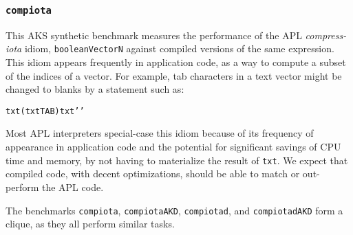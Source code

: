 \subsubsection{\tt compiota}
\label{benchmarkcompiota}

This AKS synthetic benchmark measures the performance of the
APL { \em compress-iota} idiom, {\tt booleanVector\qslash\qiota\0N}
against compiled versions of the same expression.
This idiom appears frequently in application code, as a
way to compute a subset of the indices of a vector.
For example, tab characters in a text vector might be
changed to blanks by a statement such as:

{\tt txt\qlbr (txt\qeps\0TAB)\qslash\qiota\qrho\0txt\qrbr\qlarrow'\qblank'}

Most APL interpreters special-case this idiom because of its
frequency of appearance in application code and the potential
for significant savings of CPU time and memory, by not having
to materialize the result of {\tt \qiota\qrho\0txt}. We expect
that compiled code, with decent optimizations, should be able
to match or out-perform the APL code.

The benchmarks {\tt compiota}, {\tt compiotaAKD}, {\tt compiotad}, and
{\tt compiotadAKD} form a clique, as they
all perform similar tasks.
